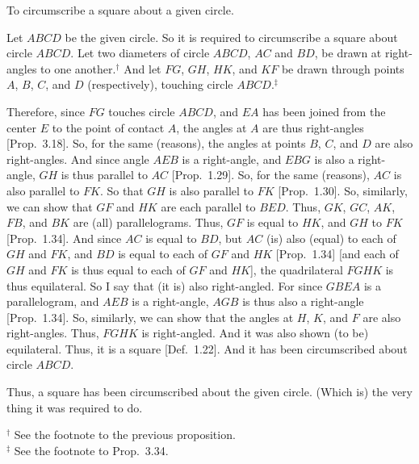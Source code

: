\begin{Parallel}{}{}
{To circumscribe a square about a given circle.

Let $ABCD$ be the given circle. So it is required to circumscribe a square
about circle $ABCD$.
Let two diameters of circle $ABCD$,  $AC$ and $BD$,  be drawn at right-angles to one another.$^\dag$
And let $FG$, $GH$, $HK$, and $KF$ be drawn through points $A$, $B$, $C$, and
$D$ (respectively), touching circle $ABCD$.$^\ddag$

Therefore, since $FG$ touches circle $ABCD$, and $EA$ has been joined from the
center $E$ to the point of contact $A$, the angles at $A$ are thus  right-angles  
[Prop.~3.18]. So, for the same (reasons), the angles at points $B$, $C$, and $D$ are also
right-angles. And since angle $AEB$ is a right-angle, and $EBG$ is also a right-angle, $GH$ is thus parallel to $AC$ [Prop.~1.29]. So, for the same
(reasons), $AC$ is also parallel to $FK$. So that $GH$ is also parallel to
$FK$ [Prop.~1.30]. So, similarly, we can show that $GF$ and $HK$ are each parallel to
$BED$. Thus, $GK$, $GC$, $AK$, $FB$, and $BK$ are (all) parallelograms. Thus, 
$GF$ is equal to $HK$, and $GH$ to $FK$ [Prop.~1.34]. And since
$AC$ is equal to $BD$, but $AC$ (is) also (equal) to each of $GH$ and $FK$,
and $BD$ is equal to each of $GF$ and $HK$ [Prop.~1.34] [and each of $GH$ and $FK$ is thus equal to each of $GF$ and $HK$], the quadrilateral $FGHK$ is
thus equilateral.  So I say that (it is) also right-angled. For since $GBEA$
is a parallelogram, and $AEB$ is a right-angle, $AGB$ is thus also a right-angle [Prop.~1.34]. So, similarly, we can show that the angles at $H$, $K$, and
$F$ are also right-angles. Thus, $FGHK$ is right-angled. And it was also shown
(to be) equilateral. Thus,  it is a square [Def.~1.22].
And it has been circumscribed about circle $ABCD$.

\epsfysize=2.2in
\centerline{}

Thus, a square has been circumscribed about the given circle. (Which is)
the very thing it was required to do.}
\end{Parallel}
{\footnotesize \noindent$^\dag$ See the footnote to the previous
 proposition.\\
 $^\ddag$ See the footnote
to Prop.~3.34.}

